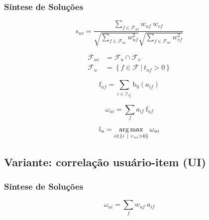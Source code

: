 \begin{frame}
\frametitle{Síntese de Soluções}
\begin{equation}
\label{eq:suv}
    s_{uv} = \frac{\sum\limits_{f \in \mathcal{F}_{uv}}{w_{uf}~w_{vf}}}{\sqrt{\sum\limits_{f \in \mathcal{F}_{uv}
    }w_{uf}^2} \sqrt{\sum\limits_{f \in \mathcal{F}_{uv}}w_{vf}^2}} 
\end{equation} 

\begin{equation}
\label{eq:fuv}
\begin{split}
    \mathcal{F}_{uv} &= \mathcal{F}_u \cap \mathcal{F}_v \\
    \mathcal{F}_u &= \left\{ f \in \mathcal{F}~|~t_{uf} > 0 \right\}
\end{split}    
\end{equation} 



\begin{equation}
\label{eq:frf} 
\mathrm{f}_{uf} = \sum_{i \in \mathcal{I}_{v_k^u}}{\mathrm{b}_0\left(a_{if}\right)}
\end{equation} 


\begin{equation}
\label{eq:wi} 
    \omega_{ui} = \sum_{f}{a_{if}~\mathrm{f}_{uf}}
\end{equation} 

\begin{equation}
\label{eq:iup} 
    \hat{\imath}_u = \operatorname*{arg\,max}_{i \in \left\{i~|~r_{ui} > 0\right\}}{\omega_{ui}}
\end{equation} 
\end{frame}


\subsection{Variante: correlação usuário-item (UI)} %
\label{sub:variante_correla_o_usu_rio_item_}
\begin{frame}
\frametitle{Síntese de Soluções}

\begin{equation}
\label{eq:wui} 
    \omega_{ui} = \sum_{f}{w_{uf}~a_{if}}
\end{equation} 
\end{frame}